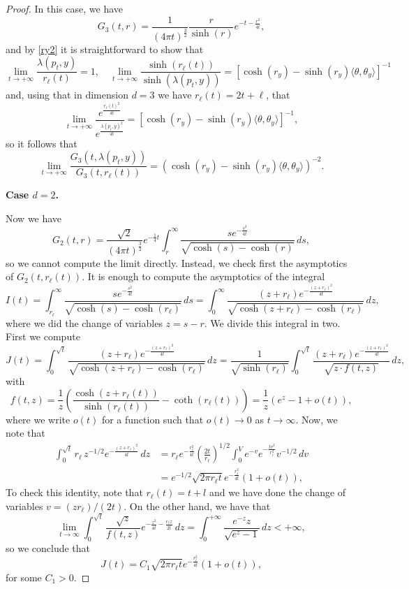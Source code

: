 \documentclass[12pt,longbibliography]{article}
\theoremstyle{definition}
\theoremstyle{remark}
\theoremstyle{example}
\begin{document}
\begin{proof}
	In this case, we have
	\[
	G_3 (t,r) = \frac{1}{(4 \pi t)^{\frac{3}{2}}} \frac{r}{\sinh (r)} e^{-t-\frac{r^2}{4 t}},
	\]
	and by \eqref{ry2} it is straightforward to show that
	\[
	\displaystyle\lim_{t \to +\infty} \frac{\lambda(p_t, y)}{r_\ell (t)} = 1,\quad \displaystyle\lim_{t \to +\infty} \frac{\sinh (r_\ell (t))}{\sinh (\lambda(p_t, y))} = [\cosh (r_y)-\sinh (r_y) \langle\theta,\theta_y\rangle]^{-1}
	\]
	and, using that in dimension $d=3$ we have $r_\ell(t)= 2t+\ell$, that
	\[
	\displaystyle\lim_{t \to +\infty} \frac{e^{\frac{r_\ell (t)^2}{4t}}}{e^{\frac{\lambda(p_t,y)^2}{4 t}}} = [\cosh (r_y)-\sinh (r_y) \langle\theta,\theta_y\rangle]^{-1},
	\]
	so it follows that
	\[
	\displaystyle\lim_{t \to +\infty} \frac{G_3 (t,\lambda(p_t, y))}{G_3 (t,r_\ell (t))} = (\cosh (r_y)-\sinh (r_y) \langle\theta,\theta_y\rangle)^{-2}.
	\]
	
	\noindent\textbf{Case $d=2$.}
	
	Now we have 
	\[
	G_2 (t,r) = \frac{\sqrt{2}}{(4 \pi t)^{\frac{3}{2}}}e^{-\frac{1}{4}t} \int_{r}^{\infty} \frac{s e^{-\frac{s^2}{4 t}}}{\sqrt{\cosh (s) -\cosh (r)}} \, ds,
	\]
	so we cannot compute the limit directly. Instead, we check first the asymptotics of $G_2 (t, r_\ell (t))$. It is enough to compute the asymptotics of the integral
	\[
	I(t) = \int_{r_\ell}^{\infty} \frac{s e^{-\frac{s^2}{4 t}}}{\sqrt{\cosh (s) -\cosh (r_\ell)}} \, ds =  \int_{0}^{\infty} \frac{(z+r_\ell) e^{-\frac{(z+r_\ell)^2}{4 t}}}{\sqrt{\cosh (z+r_\ell) -\cosh (r_\ell)}} \, dz,
	\] 
	where we did the change of variables $z=s-r$. We divide this integral in two. First we compute
	\[
	J(t) = \int_{0}^{\sqrt{t}} \frac{(z+r_\ell) e^{-\frac{(z+r_\ell)^2}{4 t}}}{\sqrt{\cosh (z+r_\ell) -\cosh (r_\ell)}} \, dz = \frac{1}{\sqrt{\sinh (r_\ell)}}\int_{0}^{\sqrt{t}} \frac{(z+r_\ell) e^{-\frac{(z+r_\ell)^2}{4 t}}}{\sqrt{z \cdot f(t,z)}} \, dz, 
	\]
	with $$f(t,z) = \frac{1}{z} \left(\frac{\cosh (z+r_\ell (t))}{ \sinh (r_\ell (t))}- \coth (r_\ell (t)) \right)= \frac{1}{z} (e^z-1 + o(t)),$$
	where we write $o(t)$ for a function such that $o(t) \to 0$ as $t \to \infty$. Now, we note that
	\[
	\begin{split}
		\int_{0}^{\sqrt{t}} r_\ell \, z^{-1/2} e^{-\frac{(z+r_\ell)^2}{4 t}} \, dz &= r_\ell e^{-\frac{r_\ell^2}{4 t}} \left(\frac{2t}{r_\ell}\right)^{1/2} \int_0^V e^{-v} e^{-\frac{tv^2}{r_\ell^2}} v^{-1/2} \, dv \\
		& = e^{-1/2} \sqrt{2 \pi r_\ell t} e^{-\frac{r_\ell^2}{4t}} (1+ o (t)),
	\end{split}
	\]
	To check this identity, note that $r_\ell (t) =t+l$ and we have done the change of variables $v=(z r_\ell) / (2t)$. On the other hand, we have that
	\[
	\displaystyle\lim_{t \to \infty} \int_0^{\sqrt{t}}\frac{ \sqrt{z}}{f(t,z)} e^{-\frac{z^2}{4 t}-\frac{r_\ell z}{2 t}} \, dz = \int_{0}^{+\infty} \frac{e^{-z} z}{\sqrt{e^z-1}} \, dz <+\infty,
	\]
	so we conclude that
	\[
	J(t) = C_1 \sqrt{2\pi r_\ell t} e^{-\frac{r_\ell^2}{4 t}} (1+o(t)),
	\]
	for some $C_1>0$. 
	

\end{proof}
\end{document}
